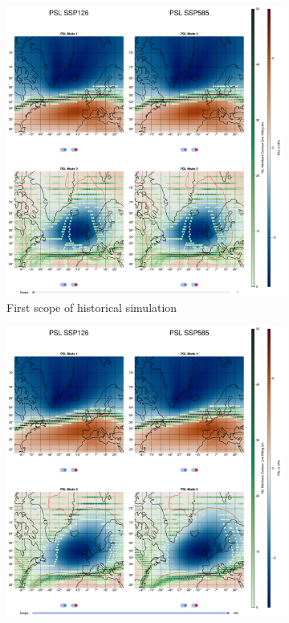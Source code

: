 \begin{figure}[!tbp]
  \begin{subfigure}[b]{0.49\textwidth}
        \includegraphics[width=\textwidth]{figures/psl_eof_2modes_historical.png}
    \caption{First scope of historical simulation}
    \label{fig:psl spatial patterns historical}
  \end{subfigure}
  \hfill
  \begin{subfigure}[b]{0.49\textwidth}
        \includegraphics[width=\textwidth]{figures/psl_eof_2modes_endscenario.png}

\end{subfigure}
\end{figure}
